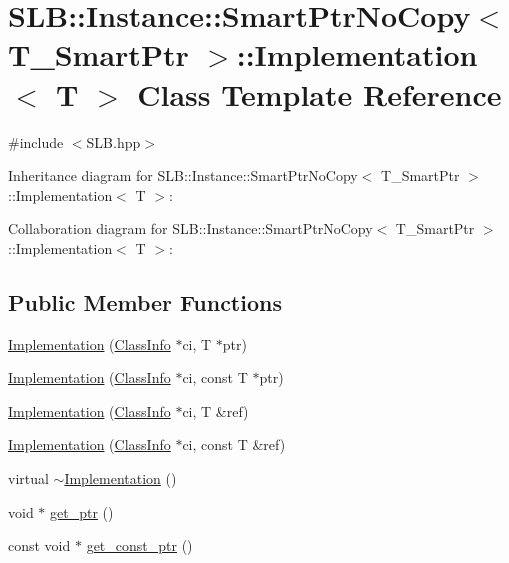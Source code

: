 \hypertarget{classSLB_1_1Instance_1_1SmartPtrNoCopy_1_1Implementation}{}\section{S\+LB\+:\+:Instance\+:\+:Smart\+Ptr\+No\+Copy$<$ T\+\_\+\+Smart\+Ptr $>$\+:\+:Implementation$<$ T $>$ Class Template Reference}
\label{classSLB_1_1Instance_1_1SmartPtrNoCopy_1_1Implementation}


{\ttfamily \#include $<$S\+L\+B.\+hpp$>$}



Inheritance diagram for S\+LB\+:\+:Instance\+:\+:Smart\+Ptr\+No\+Copy$<$ T\+\_\+\+Smart\+Ptr $>$\+:\+:Implementation$<$ T $>$\+:


Collaboration diagram for S\+LB\+:\+:Instance\+:\+:Smart\+Ptr\+No\+Copy$<$ T\+\_\+\+Smart\+Ptr $>$\+:\+:Implementation$<$ T $>$\+:
\subsection*{Public Member Functions}
\begin{DoxyCompactItemize}
\item 
\hyperlink{classSLB_1_1Instance_1_1SmartPtrNoCopy_1_1Implementation_a84ef9f5d892538f4024c537040c7cde1}{Implementation} (\hyperlink{classSLB_1_1ClassInfo}{Class\+Info} $\ast$ci, T $\ast$ptr)
\item 
\hyperlink{classSLB_1_1Instance_1_1SmartPtrNoCopy_1_1Implementation_a49c9ce004d5afcad778e26e6892c86c5}{Implementation} (\hyperlink{classSLB_1_1ClassInfo}{Class\+Info} $\ast$ci, const T $\ast$ptr)
\item 
\hyperlink{classSLB_1_1Instance_1_1SmartPtrNoCopy_1_1Implementation_a6b2f7f684e6453513fe34fa5e24b716f}{Implementation} (\hyperlink{classSLB_1_1ClassInfo}{Class\+Info} $\ast$ci, T \&ref)
\item 
\hyperlink{classSLB_1_1Instance_1_1SmartPtrNoCopy_1_1Implementation_a1ab5cccbd708f69ef35538d029a267f1}{Implementation} (\hyperlink{classSLB_1_1ClassInfo}{Class\+Info} $\ast$ci, const T \&ref)
\item 
virtual \hyperlink{classSLB_1_1Instance_1_1SmartPtrNoCopy_1_1Implementation_a5e2e9b4c69a5337d2d8fc37c1a9892f4}{$\sim$\+Implementation} ()
\item 
void $\ast$ \hyperlink{classSLB_1_1Instance_1_1SmartPtrNoCopy_1_1Implementation_a091acecf32a9194145f5c1569bece743}{get\+\_\+ptr} ()
\item 
const void $\ast$ \hyperlink{classSLB_1_1Instance_1_1SmartPtrNoCopy_1_1Implementation_afc7aeb36aa10f5e8a91d96bf8de586a7}{get\+\_\+const\+\_\+ptr} ()
\end{DoxyCompactItemize}
